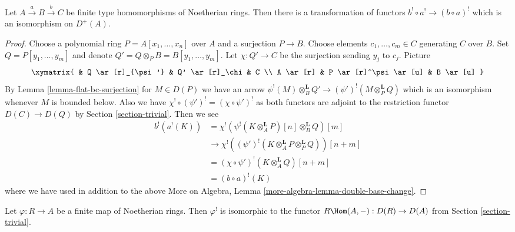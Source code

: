 \begin{lemma}
\label{lemma-composition-shriek-algebraic}
Let $A \xrightarrow{a} B \xrightarrow{b} C$ be finite type homomorphisms of
Noetherian rings. Then there is a transformation of functors
$b^! \circ a^! \to (b \circ a)^!$ which is an isomorphism on $D^+(A)$.
\end{lemma}

\begin{proof}
Choose a polynomial ring $P = A[x_1, \ldots, x_n]$ over $A$
and a surjection $P \to B$. Choose elements $c_1, \ldots, c_m \in C$
generating $C$ over $B$. Set $Q = P[y_1, \ldots, y_m]$ and
denote $Q' = Q \otimes_P B = B[y_1, \ldots, y_m]$.
Let $\chi : Q' \to C$ be the surjection sending $y_j$ to $c_j$.
Picture
$$
\xymatrix{
& Q \ar[r]_{\psi'} & Q' \ar[r]_\chi & C \\
A \ar[r] & P \ar[r]^\psi \ar[u] & B \ar[u]
}
$$
By Lemma \ref{lemma-flat-bc-surjection} for $M \in D(P)$ we have an arrow
$\psi^!(M) \otimes_B^\mathbf{L} Q' \to (\psi')^!(M \otimes_P^\mathbf{L} Q)$
which is an isomorphism whenever $M$ is bounded below. Also
we have $\chi^! \circ (\psi')^! = (\chi \circ \psi')^!$ as both
functors are adjoint to the restriction functor $D(C) \to D(Q)$
by Section \ref{section-trivial}. Then we see
\begin{align*}
b^!(a^!(K))
& =
\chi^!(\psi^!(K \otimes_A^\mathbf{L} P)[n] \otimes_B^\mathbf{L} Q)[m] \\
& \to
\chi^!((\psi')^!(K \otimes_A^\mathbf{L} P \otimes_P^\mathbf{L} Q))[n + m] \\
& =
(\chi \circ \psi')^!(K\otimes_A^\mathbf{L} Q)[n + m] \\
& =
(b \circ a)^!(K)
\end{align*}
where we have used in addition to the above
More on Algebra, Lemma \ref{more-algebra-lemma-double-base-change}.
\end{proof}

\begin{lemma}
\label{lemma-upper-shriek-finite}
Let $\varphi : R \to A$ be a finite map of Noetherian rings.
Then $\varphi^!$ is isomorphic to the functor
$R\Hom(A, -) : D(R) \to D(A)$ from
Section \ref{section-trivial}.
\end{lemma}

